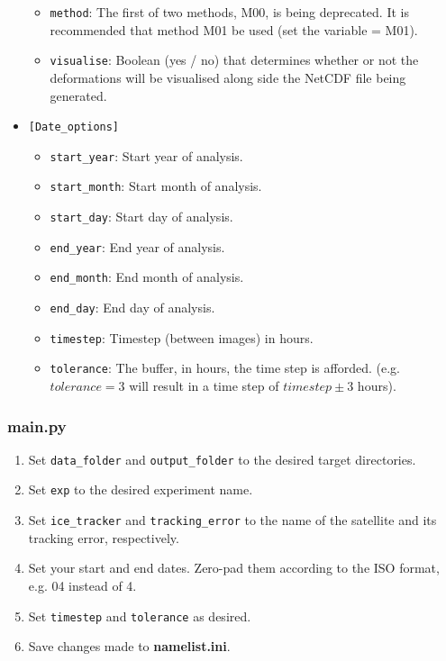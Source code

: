 \documentclass{article}
\begin{document}
\begin{itemize}
\begin{itemize}
                \item \verb?method?: The first of two methods, M00, is being deprecated. It is recommended that method M01 be used (set the variable = M01).
                \item \verb?visualise?: Boolean (yes / no) that determines whether or not the deformations will be visualised along side the NetCDF file being generated.
            \end{itemize}
            \item{} \verb?[Date_options]?
            \begin{itemize}
                \item \verb?start_year?: Start year of analysis.
                \item \verb?start_month?: Start month of analysis.
                \item \verb?start_day?: Start day of analysis.
                \item \verb?end_year?: End year of analysis.
                \item \verb?end_month?: End month of analysis.
                \item \verb?end_day?: End day of analysis.
                \item \verb?timestep?: Timestep (between images) in hours.
                \item \verb?tolerance?: The buffer, in hours, the time step is afforded. (e.g. $tolerance = 3$ will result in a time step of $timestep \pm 3$ hours).
            \end{itemize}
        \end{itemize}

        \subsubsection{\textbf{main.py}}

            \begin{enumerate}
                \item Set \verb?data_folder? and \verb?output_folder? to the desired target directories.
                \item Set \verb?exp? to the desired experiment name.
                \item Set \verb?ice_tracker? and \verb?tracking_error? to the name of the satellite and its tracking error, respectively.
                \item Set your start and end dates. Zero-pad them according to the ISO format, e.g. 04 instead of 4.
                \item Set \verb?timestep? and \verb?tolerance? as desired.
                \item Save changes made to \textbf{namelist.ini}.
            \end{enumerate}
\end{document}

